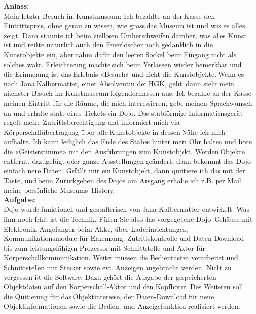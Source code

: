 \documentclass[10pt,a4paper,oneside]{99_fhnwreport}
\begin{document}
\textbf{Anlass:}\\
Mein letzter Besuch im Kunstmuseum: Ich bezahlte an der Kasse den
Eintrittspreis, ohne genau zu wissen, wie gross das Museum ist und was es alles zeigt. Dann
staunte ich beim ziellosen Umherschweifen darüber, was alles Kunst ist und reihte natürlich
auch den Feuerlöscher noch gedanklich in die Kunstobjekte ein, aber nahm dafür den leeren
Sockel beim Eingang nicht als solches wahr. Erleichterung machte sich beim Verlassen wieder
bemerkbar und die Erinnerung ist das Erlebnis «Besuch» und nicht die Kunstobjekte.
Wenn es nach Jana Kalbermatter, einer Absolventin der HGK, geht, dann sieht mein nächster
Besuch im Kunstmuseum folgendermassen aus: Ich bezahle an der Kasse meinen Eintritt für
die Räume, die mich interessieren, gebe meinen Sprachwunsch an und erhalte statt eines
Tickets ein Dojo. Das stabförmige Informationsgerät regelt meine Zutrittsberechtigung und
informiert mich via Körperschallübertragung über alle Kunstobjekte in dessen Nähe ich mich
aufhalte. Ich kann lediglich das Ende des Stabes hinter mein Ohr halten und höre die
«Geisterstimme» mit den Ausführungen zum Kunstobjekt. Werden Objekte entfernt, dazugefügt
oder ganze Ausstellungen geändert, dann bekommt das Dojo einfach neue Daten. Gefällt mir
ein Kunstobjekt, dann quittiere ich das mit der Taste, und beim Zurückgeben des Dojos am
Ausgang erhalte ich z.B. per Mail meine persönliche Museums–History.\\
\textbf{Aufgabe:}\\
Dojo wurde funktionell und gestalterisch von Jana Kalbermatter entwickelt. Was
ihm noch fehlt ist die Technik. Füllen Sie also das vorgegebene Dojo–Gehäuse mit Elektronik.
Angefangen beim Akku, über Ladeeinrichtungen, Kommunikationsmodule für Erkennung,
Zutrittskontrolle und Daten-Download bis zum leistungsfähigen Prozessor mit Schnittstelle und
Aktor für Körperschallkommunikation. Weiter müssen die Bedientasten verarbeitet und
Schnittstellen mit Stecker sowie evt. Anzeigen angebracht werden. Nicht zu vergessen ist die
Software. Dazu gehört die Ausgabe der gespeicherten Objektdaten auf den Körperschall-Aktor
und den Kopfhörer. Des Weiteren soll die Quitierung für das Objektinteresse, der Daten-Download für neue Objektinformationen sowie die Bedien. und Anzeigefunktion realisiert werden.\cite{PFLVOR}

\end{document}
